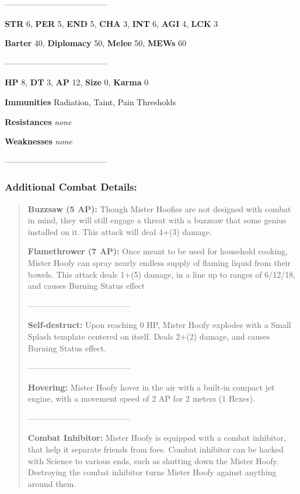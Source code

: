 \documentclass[11pt,a4paper,twocolumn]{book}
\begin{document}
--------------------------------------

\noindent
\textbf{STR} 6, \textbf{PER} 5, \textbf{END} 5, \textbf{CHA} 3, \textbf{INT} 6, \textbf{AGI} 4, \textbf{LCK} 3

\noindent
\textbf{Barter} 40, \textbf{Diplomacy} 50, \textbf{Melee} 50, \textbf{MEWs} 60

--------------------------------------

\noindent
\textbf{HP} 8, \textbf{DT} 3, \textbf{AP} 12, \textbf{Size} 0, \textbf{Karma} 0


\noindent
\textbf{Immunities} Radiation, Taint, Pain Thresholds

\noindent
\textbf{Resistances} \emph{none} %

\noindent
\textbf{Weaknesses} \emph{none}%

--------------------------------------	

	\subsubsection*{Additional Combat Details:}
	\begin{verse}
		\textbf{Buzzsaw (5 AP):} Though Mister Hoofies are not designed with combat in mind, they will still engage a threat with a buzzsaw that some genius installed on it. This attack will deal 4+(3) damage.
		
		\textbf{Flamethrower (7 AP):} Once meant to be used for household cooking, Mister Hoofy can spray nearly endless supply of flaming liquid from their bowels. This attack deals 1+(5) damage, in a line up to ranges of 6/12/18, and causes Burning Status effect
	
	--------------------------------------
		
		\textbf{Self-destruct:} Upon reaching 0 HP, Mister Hoofy explodes with a Small Splash template centered on itself. Deals 2+(2) damage, and causes Burning Status effect.
		
		--------------------------------------
		
		\textbf{Hovering:} Mister Hoofy hover in the air with a built-in compact jet engine, with a movement speed of 2 AP for 2 meters (1 Hexes).
		
	 --------------------------------------
		
		\textbf{Combat Inhibitor:} Mister Hoofy is equipped with a combat inhibitor, that help it separate friends from foes. Combat inhibitor can be hacked with Science to various ends, such as shutting down the Mister Hoofy. Destroying the combat inhibitor turns Mister Hoofy against anything around them. 
		
%		
%		
	\end{verse}
	
\end{document}
